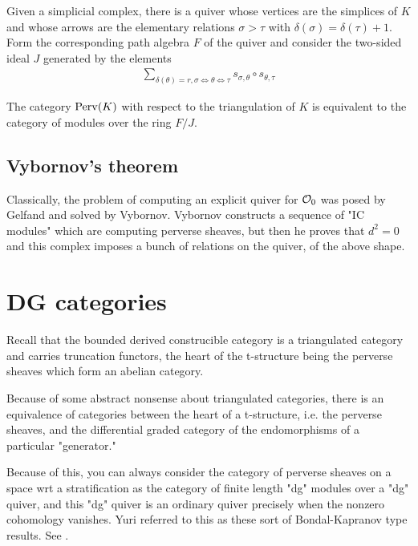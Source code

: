 \documentclass[12pt]{article}
\begin{document}
\hfill

Given a simplicial complex, there is a quiver whose vertices are the simplices of $K$ and whose
arrows are the elementary relations $\sigma > \tau$ with $\delta(\sigma) = \delta(\tau) +1$.
Form the corresponding path algebra $F$ of the quiver and consider the two-sided ideal $J$ 
generated by the elements \begin{align*}
    \sum_{\delta(\theta) = r, \sigma \iff \theta \iff \tau} s_{\sigma,\theta} \circ s_{\theta,\tau}
\end{align*}

\begin{theorem}
    The category $\operatorname{Perv}(K)$ with respect to the triangulation of $K$ is equivalent to the
    category of modules over the ring $F/J$.
\end{theorem}

\subsection{Vybornov's theorem}
Classically, the problem of computing an explicit quiver for ${\mathcal{O}}_{0}$ was posed by Gelfand
and solved by Vybornov. Vybornov constructs a sequence of "IC modules" which are computing 
perverse sheaves, but then he proves that $d^2 = 0$ and 
this complex imposes a bunch of relations on the quiver, of the above shape.
\section{DG categories}
Recall that the bounded derived construcible category is a 
triangulated category and carries truncation functors, the 
heart of the t-structure being the perverse sheaves which form an abelian category.

\hfill

Because of some abstract nonsense about triangulated categories,
there is an equivalence of categories between the heart of a t-structure, i.e.
the perverse sheaves, and the differential graded category of the 
endomorphisms of a particular "generator."

\hfill

Because of this, you can always consider the category of perverse sheaves
on a space wrt a stratification as the category of finite length "dg" modules
over a "dg" quiver, and this "dg" quiver is an ordinary quiver precisely when the 
nonzero cohomology vanishes. Yuri referred to this as 
these sort of Bondal-Kapranov type results. See \cite{bondal-kapranov}.
\end{document}
